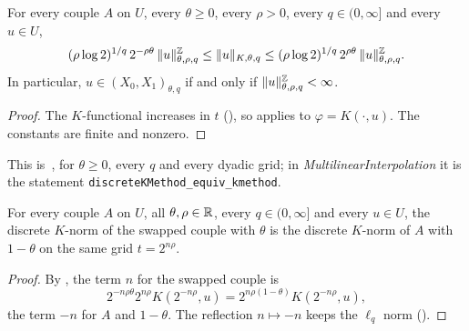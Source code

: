 \begin{theorem}
\label{thm:couple-discrete-continuous}
\leanok
{}
For every couple $A$ on $U$, every $\theta \geq 0$, every $\rho > 0$, every $q \in (0, \infty]$
and every $u \in U$,
\[
  (\rho \log 2)^{1/q} \, 2^{-\rho\theta} \, \|u\|^{\mathbb{Z}}_{\theta, \rho, q}
  \leq \|u\|_{K, \theta, q}
  \leq (\rho \log 2)^{1/q} \, 2^{\rho\theta} \, \|u\|^{\mathbb{Z}}_{\theta, \rho, q} .
\]
In particular, $u \in (X_0, X_1)_{\theta, q}$ if and only if
$\|u\|^{\mathbb{Z}}_{\theta, \rho, q} < \infty$.
\end{theorem}

\begin{proof}
\leanok
The $K$-functional increases in $t$ (), so
 applies to $\varphi = K(\cdot, u)$. The constants
are finite and nonzero.
\end{proof}

This is~\cite[Lemma~3.1.3]{BerghLofstrom}, for $\theta \geq 0$, every $q$ and every dyadic grid;
in \emph{MultilinearInterpolation} it is the statement
\texttt{discreteKMethod\_\allowbreak equiv\_\allowbreak kmethod}.

\begin{lemma}
\label{lem:couple-k-method-swap}
\leanok
{}
For every couple $A$ on $U$, all $\theta, \rho \in \mathbb{R}$, every $q \in (0, \infty]$ and every
$u \in U$, the discrete $K$-norm of the swapped couple with $\theta$ is the discrete $K$-norm of
$A$ with $1 - \theta$ on the same grid $t = 2^{n\rho}$.
\end{lemma}

\begin{proof}
\leanok
By , the term $n$ for the swapped couple is
\[
  2^{-n\rho\theta} 2^{n\rho} K(2^{-n\rho}, u) = 2^{n\rho(1 - \theta)} K(2^{-n\rho}, u) ,
\]
the term $-n$ for $A$ and $1 - \theta$. The reflection $n \mapsto -n$ keeps the $\ell_q$ norm
().
\end{proof}

